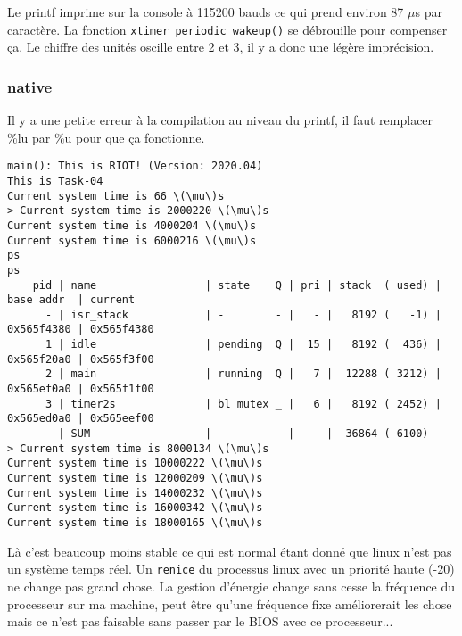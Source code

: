 Le printf imprime sur la console à 115200 bauds ce qui prend environ
87 $\mu$s par caractère. La fonction \texttt{xtimer\_periodic\_wakeup()}
se débrouille pour compenser ça. Le chiffre des unités oscille entre 2
et 3, il y a donc une légère imprécision.\\

\subsubsection{native}
Il y a une petite erreur à la compilation au niveau du printf, il faut
remplacer \%lu par \%u pour que ça fonctionne.
{\scriptsize
\begin{verbatim}
main(): This is RIOT! (Version: 2020.04)
This is Task-04
Current system time is 66 \(\mu\)s
> Current system time is 2000220 \(\mu\)s
Current system time is 4000204 \(\mu\)s
Current system time is 6000216 \(\mu\)s
ps
ps
	pid | name                 | state    Q | pri | stack  ( used) | base addr  | current     
	  - | isr_stack            | -        - |   - |   8192 (   -1) | 0x565f4380 | 0x565f4380
	  1 | idle                 | pending  Q |  15 |   8192 (  436) | 0x565f20a0 | 0x565f3f00 
	  2 | main                 | running  Q |   7 |  12288 ( 3212) | 0x565ef0a0 | 0x565f1f00 
	  3 | timer2s              | bl mutex _ |   6 |   8192 ( 2452) | 0x565ed0a0 | 0x565eef00 
	    | SUM                  |            |     |  36864 ( 6100)
> Current system time is 8000134 \(\mu\)s
Current system time is 10000222 \(\mu\)s
Current system time is 12000209 \(\mu\)s
Current system time is 14000232 \(\mu\)s
Current system time is 16000342 \(\mu\)s
Current system time is 18000165 \(\mu\)s
\end{verbatim}
}

Là c'est beaucoup moins stable ce qui est normal étant donné que linux
n'est pas un système temps réel. Un \texttt{renice} du processus linux
avec un priorité haute (-20) ne change pas grand chose. La gestion d'énergie
change sans cesse la fréquence du processeur sur ma machine, peut être
qu'une fréquence fixe améliorerait les chose mais ce n'est pas faisable
sans passer par le BIOS avec ce processeur...

